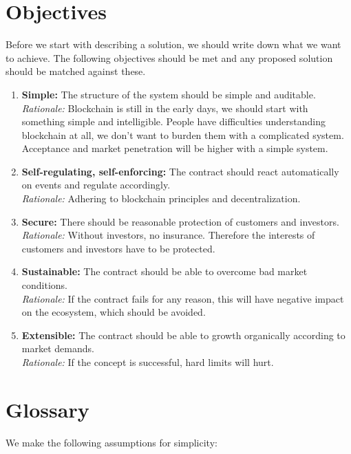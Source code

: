 \documentclass[runningheads,a4paper]{llncs}
\begin{document}
\section{Objectives}
Before we start with describing a solution, we should write down what we want to achieve.
The following objectives should be met and any proposed solution should be matched against these.
\begin{enumerate}
    \item \textbf{Simple:} The structure of the system should be simple and auditable.\\
    \textit{Rationale:} Blockchain is still in the early days, we should start with something simple and
    intelligible. People have difficulties understanding blockchain at all, we don't want to burden them 
    with a complicated system. Acceptance and market penetration will be higher with a simple system.
    \item \textbf{Self-regulating, self-enforcing:} The contract should 
    react automatically on events and regulate accordingly.\\
    \textit{Rationale:} Adhering to blockchain principles and decentralization.
    \item \textbf{Secure:} There should be reasonable protection of customers and investors.\\
    \textit{Rationale:} Without investors, no insurance. Therefore the interests of customers and investors
    have to be protected.
    \item \textbf{Sustainable:} The contract should be able to overcome bad market conditions. \\
    \textit{Rationale:} If the contract fails for any reason, this will have negative impact on the ecosystem, 
    which should be avoided.
    \item \textbf{Extensible:} The contract should be able to growth organically according to market demands.\\
    \textit{Rationale:} If the concept is successful, hard limits will hurt.
\end{enumerate}


\section{Glossary}

We make the following assumptions for simplicity:
\end{document}
